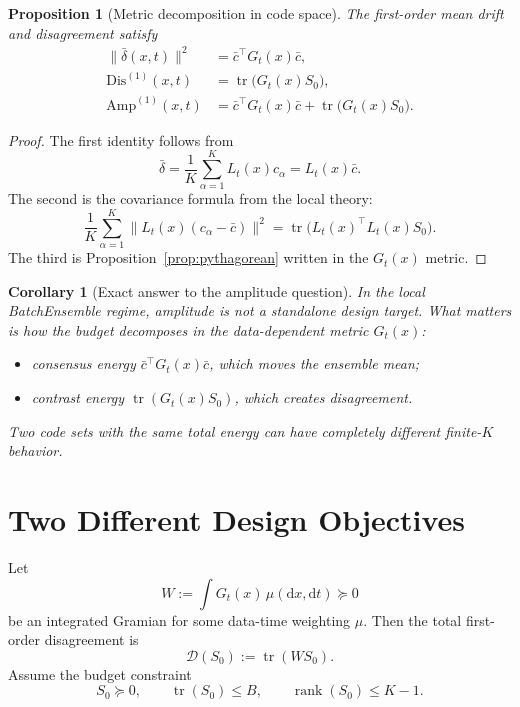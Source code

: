 \documentclass[11pt]{article}
\newcommand{\tr}{\operatorname{tr}}
\newcommand{\rank}{\operatorname{rank}}
\newtheorem{proposition}[theorem]{Proposition}
\newtheorem{corollary}[theorem]{Corollary}
\theoremstyle{remark}
\begin{document}
\begin{proposition}[Metric decomposition in code space]
\label{prop:metric-decomposition}
The first-order mean drift and disagreement satisfy
\begin{align}
\|\bar\delta(x,t)\|^2
&=
\bar c^\top G_t(x)\bar c,
\label{eq:mean-code}\\
\mathrm{Dis}^{(1)}(x,t)
&=
\tr\!\bigl(G_t(x)S_0\bigr),
\label{eq:dis-code}\\
\mathrm{Amp}^{(1)}(x,t)
&=
\bar c^\top G_t(x)\bar c
+ \tr\!\bigl(G_t(x)S_0\bigr).
\label{eq:amp-code}
\end{align}
\end{proposition}

\begin{proof}
The first identity follows from
\[
\bar\delta
=
\frac1K\sum_{\alpha=1}^K L_t(x)c_\alpha
=
L_t(x)\bar c.
\]
The second is the covariance formula from the local theory:
\[
\frac1K\sum_{\alpha=1}^K \|L_t(x)(c_\alpha-\bar c)\|^2
=
\tr\!\bigl(L_t(x)^\top L_t(x) S_0\bigr).
\]
The third is Proposition~\ref{prop:pythagorean} written in the $G_t(x)$ metric.
\end{proof}

\begin{corollary}[Exact answer to the amplitude question]
\label{cor:exact-answer}
In the local BatchEnsemble regime, amplitude is not a standalone design target. What matters is how the budget decomposes in the data-dependent metric $G_t(x)$:
\begin{itemize}
\item consensus energy $\bar c^\top G_t(x)\bar c$, which moves the ensemble mean;
\item contrast energy $\tr(G_t(x)S_0)$, which creates disagreement.
\end{itemize}
Two code sets with the same total energy can have completely different finite-$K$ behavior.
\end{corollary}

\section{Two Different Design Objectives}

Let
\[
W := \int G_t(x)\,\mu(\mathrm dx,\mathrm dt)\succeq 0
\]
be an integrated Gramian for some data-time weighting $\mu$. Then the total first-order disagreement is
\[
\mathcal D(S_0) := \tr(WS_0).
\]
Assume the budget constraint
\[
S_0\succeq 0,
\qquad
\tr(S_0)\le B,
\qquad
\rank(S_0)\le K-1.
\]
\end{document}
